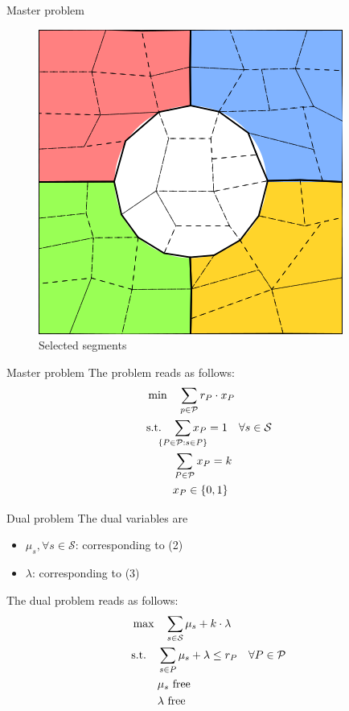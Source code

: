 \documentclass[fleqn]{beamer}
\newcommand{\superpixels}{\mathcal{S}}
\begin{document}
	\begin{frame}{Master problem}
		\begin{figure}
			\centering
			\includegraphics[scale=.5]{data_segments.png}
			\caption{Selected segments}
		\end{figure}
	\end{frame}
	
	
	\begin{frame}{Master problem}
		The problem reads as follows:
		\begin{align}
    		&\min\quad \sum_{p\in\mathcal{P}} r_P\cdot x_P\\
		    &\text{s.t.}\quad \smashoperator{\sum_{\{P\in\mathcal{P}:s\in P\}}} x_P = 1 \quad\forall s\in\superpixels \\
		    &\phantom{\text{s.t.}\quad} \sum_{P\in\mathcal{P}} x_P = k \\
		    &\phantom{\text{s.t.}\quad} x_P \in \{0,1\}
		\end{align}
	\end{frame}
	
	\begin{frame}{Dual problem}
		The dual variables are
		\begin{itemize}
			\item $\mu_s, \forall s\in\superpixels$: corresponding to (2)
			\item $\lambda$: corresponding to (3)
		\end{itemize}
		
		The dual problem reads as follows:
		\begin{align}
		    &\max\quad \smashoperator{\sum_{s\in\superpixels}} \mu_s + k\cdot\lambda \\
		    &\text{s.t.}\quad \sum_{s\in P} \mu_s + \lambda \leq r_P \quad\forall P\in\mathcal{P} \\
		    &\phantom{\text{s.t.}\quad} \mu_s \text{ free} \\
		    &\phantom{\text{s.t.}\quad} \lambda \text{ free}
		\end{align}
	\end{frame}
	
\end{document}
